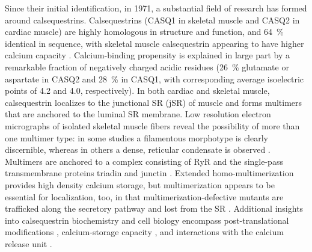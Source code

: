 
Since their initial identification, in 1971, a substantial field of research has formed around calsequestrins. Calsequestrins (CASQ1 in skeletal muscle and CASQ2 in cardiac muscle) are highly homologous in structure and function, and \SI{64}{\percent} identical in sequence, with skeletal muscle calsequestrin appearing to have higher calcium capacity \supercite{Park2004-bu}. Calcium-binding propensity is explained in large part by a remarkable fraction of negatively charged acidic residues (\SI{26}{\percent} glutamate or aspartate in CASQ2 and \SI{28}{\percent} in CASQ1, with corresponding average isoelectric points of 4.2 and 4.0, respectively). In both cardiac and skeletal muscle, calsequestrin localizes to the junctional SR (jSR) of muscle and forms multimers that are anchored to the luminal SR membrane. Low resolution electron micrographs of isolated skeletal muscle fibers reveal the possibility of more than one multimer type: in some studies a filamentous morphotype is clearly discernible, whereas in others a dense, reticular condensate is observed \supercite{Franzini-Armstrong1987-xb,Perni2013-ew}. Multimers are anchored to a complex consisting of RyR and the single-pass transmembrane proteins triadin and junctin \supercite{Bers2004-ns}. Extended homo-multimerization provides high density calcium storage, but multimerization appears to be essential for localization, too, in that multimerization-defective mutants are trafficked along the secretory pathway and lost from the SR \supercite{Milstein2009-ig,McFarland2010-yi,Knollmann2010-fl}. Additional insights into calsequestrin biochemistry and cell biology encompass post-translational modifications \supercite{Sanchez2012-yl,Kirchhefer2010-ui}, calcium-storage capacity \supercite{Park2004-bu}, and interactions with the calcium release unit \supercite{Zhang1997-dy,Rani2016-ql,Handhle2016-mz}.

